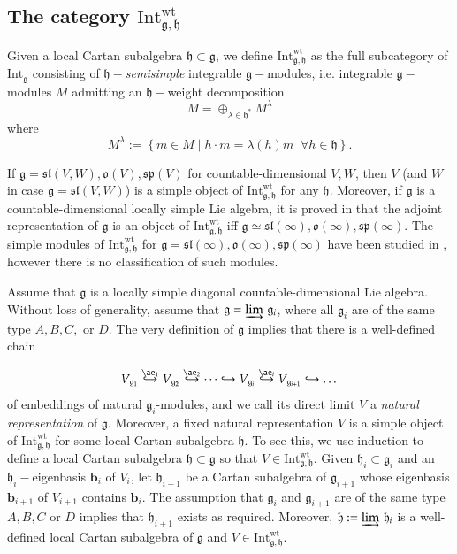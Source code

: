 \documentclass[10pt]{amsart}
\newcommand{\wt}{\mathrm{wt}}
\renewcommand{\sp}{\mathfrak{sp}}
\renewcommand{\sl}{\mathfrak{sl}}
\newcommand{\oj}{\mathfrak{g}}
\newcommand{\oo}{\mathfrak{o}}
\newcommand{\hh}{\mathfrak{h}}
\renewcommand{\gg}{\mathfrak{g}}
\newcommand{\Int}{\mathrm{Int}}
\begin{document}
\subsection {The category  $\mathrm{Int}^{\wt}_{\gg,\hh}$}\label{sect:3.2}
Given a local Cartan subalgebra $\hh \subset \gg$, we define 
$\mathrm{Int}^{\wt}_{\gg,\hh}$ as the full subcategory of $\mathrm{Int}_{\gg}$ 
consisting of \textit{$\hh-$semisimple} integrable $\gg-$modules, i.e. integrable $\gg-$modules $M$ admitting an $\hh-$weight decomposition
\begin{equation}\label{M_weight_dec}
 M = \oplus_{\lambda \in \hh^*} M^{\lambda}
\end{equation}
where 
\begin{equation}\label{eq.6}
M^{\lambda} := \left\lbrace m \in M\; |\; h \cdot m = \lambda(h)m\;\; \forall h \in \hh\right\rbrace. 
\end{equation}


If $\gg = \sl(V,W), \oo(V), \sp(V)$ for countable-dimensional $V,W$, then $V$ (and $W$ in case $\gg = \sl(V,W)$) is a simple object of $\Int^{\wt}_{\gg,\hh}$ for any $\hh$. Moreover, if $\gg$ is a countable-dimensional locally simple Lie algebra, it is proved in \cite{pstr} that the adjoint representation of $\gg$ is an object of $\Int^{\wt}_{\gg,\hh}$ iff $\gg \simeq \sl(\infty), \oo(\infty), \sp(\infty)$. The simple modules of $\Int^{\wt}_{\gg,\hh}$ for $\gg = \sl(\infty),\oo(\infty),\sp(\infty)$ have been studied in \cite{dip}, however there is no classification of such modules.

Assume that $\gg$ is a locally simple diagonal countable-dimensional Lie algebra. Without loss of generality, assume that $\gg = \varinjlim\,\gg_i$, where all $\gg_i$ are of the same type $A,B,C,$ or $D$. The very definition of $\gg$ implies that there is a well-defined chain

\begin{equation}\label{inf_ch_nat}
 V_{\oj_{1}} \stackrel{\ae_1}{\hookrightarrow} V_{\oj_{2}} \stackrel{\ae_2}{\hookrightarrow} \dots \hookrightarrow V_{\oj_{i}} \stackrel{\ae_i}{\hookrightarrow} V_{\oj_{i+1}} \hookrightarrow \dots
\end{equation}
of embeddings of natural $\oj_i$-modules, and we call its direct limit $V$ a \textit{natural representation} of $\oj$. Moreover, a fixed natural representation $V$ is a simple object of $\Int^{\wt}_{\gg,\hh}$ for some local Cartan subalgebra $\hh$. To see this, we use induction to define a local Cartan subalgebra $\hh \subset \gg$ so that $V \in \Int^{\wt}_{\gg,\hh}$. Given $\hh_i \subset \gg_i$ and an $\hh_i-$eigenbasis $\textbf{b}_{i}$ of $V_{i}$, let $\hh_{i+1}$ be a Cartan subalgebra of $\gg_{i+1}$ whose eigenbasis $\textbf{b}_{i+1}$ of $V_{i+1}$ contains $\textbf{b}_i$. The assumption that $\gg_i$ and $\gg_{i+1}$ are of the same type $A,B,C$ or $D$ implies that $\hh_{i+1}$ exists as required. Moreover, $\hh:=\varinjlim\,\hh_i$ is a well-defined local Cartan subalgebra of $\gg$ and  $V \in \Int^{\wt}_{\gg,\hh}$.
\end{document}
